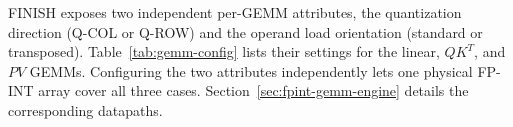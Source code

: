 \documentclass[sigconf,anonymous,nonacm]{acmart}
\newcommand{\ours}{\textsc{FINISH}}
\newcommand{\fpint}{FP-INT}
\newcommand{\qcol}{Q-COL}
\newcommand{\qrow}{Q-ROW}
\begin{document}

\ours{} exposes two independent per-GEMM attributes, the quantization direction (Q-COL or Q-ROW) and the operand load orientation (standard or transposed). Table~\ref{tab:gemm-config} lists their settings for the linear, $QK^T$, and $PV$ GEMMs. Configuring the two attributes independently lets one physical FP-INT array cover all three cases. Section~\ref{sec:fpint-gemm-engine} details the corresponding datapaths.
\end{document}
